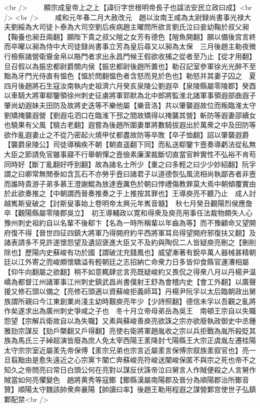 <br />
　　顯宗成皇帝上之上【諱衍字世根明帝長子也諡法安民立政曰成】<br />
<br />
　　咸和元年春二月大赦改元　趙以汝南王咸為太尉録尚書事光禄大夫劉綏為大司徒卜泰為大司空劉后疾病趙主曜問所欲言劉氏泣曰妾幼鞠於叔父昶【鞠養也昶丑兩翻】願陛下貴之叔父皚之女芳有德色【皚魚開翻】願以備後宫言終而卒曜以昶為侍中大司徒録尚書事立芳為皇后尋又以昶為太保　三月後趙主勒夜微行檢察諸營衛齎金帛以賂門者求出永昌門候王假欲收捕之從者至乃止【從才用翻】旦召假以為振忠都尉爵關内侯【振忠都尉後趙所置也】勒召記室參軍徐光光醉不至黜為牙門光侍直有愠色【愠於問翻愠色者含怒而見於色也】勒怒并其妻子囚之　夏四月後趙將石生寇汝南執内史祖濟六月癸亥泉陵公劉遐卒【泉陵縣屬零陵郡】癸酉以車騎大將軍郗鑒領徐州刺史征虜將軍郭默為北中郎將監淮北諸軍事領遐部曲遐子肇尚幼遐妹夫田防及故將史迭等不樂他屬【樂音洛】共以肇襲遐故位而叛臨淮太守劉矯掩襲遐營【劉遐屯泗口在臨淮下邳之間故矯得以掩襲其營】斬防等遐妻邵續女也驍果有父風【驍古老翻】遐嘗為後趙所圍妻單將數騎拔遐出於萬衆之中及田防等欲作亂遐妻止之不從乃密起火燒甲仗都盡故防等卒敗【卒子恤翻】詔以肇襲遐爵【襲爵泉陵公】司徒導稱疾不朝【朝直遥翻下同】而私送郗鑒卞壼奏導虧法從私無大臣之節請免官雖事寢不行舉朝憚之壼儉素廉潔裁斷切直當官幹實性不弘裕不肯苟同時好【斷丁亂翻好呼到翻】故為諸名士所少【重之曰多輕之曰少少妙紹翻】阮孚謂之曰卿常無閒泰如含瓦石不亦勞乎壼曰諸君子以道德恢弘風流相尚執鄙吝者非壼而誰時貴游子弟多慕王澄謝鯤為放達壼厲色於朝曰悖禮傷教罪莫大焉中朝傾覆實由於此欲奏推之【中朝謂西晉奏推奏之于上推按其罪也】王導庾亮不聽乃止　成人討越嶲斯叟破之【討斯叟事始上卷明帝太興元年嶲音髓】　秋七月癸丑觀陽烈侯應詹卒【觀陽縣屬零陵郡吳立】　初王導輔政以寛和得衆及庾亮用事任法裁物頗失人心豫州刺史祖約自以名輩不後郗卞【名為一時所稱輩以年齒為等】而不豫顧命又望開府復不得【晉世四征四鎮大將軍乃得開府約平西將軍耳烏得望開府邪復扶又翻】及諸表請多不見許遂懷怨望及遺詔褒進大臣又不及約與陶侃二人皆疑庾亮刪之【刪削除也】歷陽内史蘇峻有功於國【謂破沈充錢鳳也】威望漸著有銳卒萬人器械甚精朝廷以江外寄之而峻頗懷驕溢有輕朝廷之志招納亡命衆力日多皆仰食縣官運漕相屬【仰牛向翻屬之欲翻】稍不如意輒肆忿言亮既疑峻約又畏侃之得衆八月以丹楊尹温嶠為都督江州諸軍事江州刺史鎮武昌尚書僕射王舒為會稽内史【會工外翻】以廣聲援又修石頭以備之【亮修石頭適以資蘇峻拒義師耳】丹楊尹阮孚以太后臨朝政出舅族謂所親曰今江東創業尚淺主幼時艱庾亮年少【少詩照翻】德信未孚以吾觀之亂將作矣遂求出為廣州刺史爭咸之子也　冬十月立帝母弟岳為吳王　南頓王宗自以失職怨望【宗解兵衛故自以為失職】又素與蘇峻善庾亮欲誅之宗亦欲廢執政御史中丞鍾雅劾宗謀反【劾戶槩翻又戶得翻】亮使右衛將軍趙胤收之宗以兵拒戰為胤所殺貶其族為馬氏三子綽超演皆廢為庶人免太宰西陽王羕降封弋陽縣王大宗正虞胤左遷桂陽太守宗宗室近屬羕先帝保傅【羕宗兄弟也宗言近屬羕言保傅宗叙族羕叙官也】亮一旦翦黜由是愈失遠近之心宗黨卞闡亡奔蘇峻亮符峻送闡峻保匿不與宗之死也帝不之知久之帝問亮曰常日白頭公何在亮對以謀反伏誅帝泣曰舅言人作賊便殺之人言舅作賊當如何亮懼變色　趙將黄秀等寇鄼【鄼縣漢屬南陽郡及晉分為順陽郡治所鄼音贊】順陽太守魏該帥衆奔襄陽【帥讀曰率】後趙王勒用程遐之謀營鄴宫使世子弘鎮鄴配禁<br />
